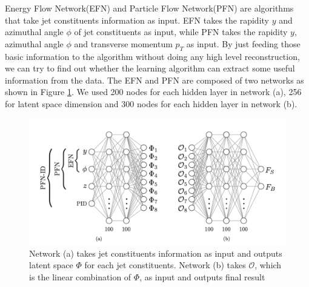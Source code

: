%
%
%
%
%
%

\label{sec:EFN}
Energy Flow Network(EFN) and Particle Flow Network(PFN) are algorithms that take jet constituents information as input. EFN takes the rapidity ${y}$ and azimuthal angle ${\phi}$ of jet constituents as input, while PFN takes the rapidity $y$, azimuthal angle $\phi$ and transverse momentum $p_{T}$ as input. 
By just feeding those basic information to the algorithm without doing any high level reconstruction, we can try to find out whether the learning algorithm can extract some useful information from the data.
The EFN and PFN are composed of two networks as shown in Figure \ref{fig:EFNArch}. 
We used 200 nodes for each hidden layer in network (a), 256 for latent space dimension and 300 nodes for each hidden layer in network (b). 

\begin{figure}[ht!]
\centering
\includegraphics[scale=0.5]{./EFN/EFNArch.png}
\caption{Network (a) takes jet constituents information as input and outputs latent space $\Phi$ for each jet constituents. Network (b) takes $\mathcal{O}$, which is the linear combination of $\Phi$, as input and outputs final result}
\label{fig:EFNArch}
\end{figure}


